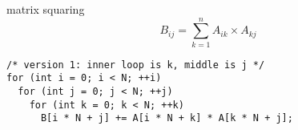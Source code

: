 \begin{frame}[fragile,label=matrixSquare]{matrix squaring}
\[ B_{ij} = \sum_{k=1}^n A_{ik}\times A_{kj} \]
\lstset{language=C,style=small}
\begin{lstlisting}
/* version 1: inner loop is k, middle is j */
for (int i = 0; i < N; ++i)
  for (int j = 0; j < N; ++j)
    for (int k = 0; k < N; ++k)
      B[i * N + j] += A[i * N + k] * A[k * N + j];
\end{lstlisting}
\end{frame}
